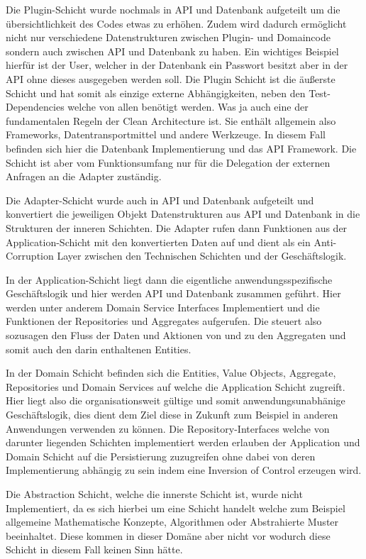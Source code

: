 Die Plugin-Schicht wurde nochmals in API und Datenbank aufgeteilt um die übersichtlichkeit des Codes etwas zu erhöhen.
Zudem wird dadurch ermöglicht nicht nur verschiedene Datenstrukturen zwischen Plugin- und Domaincode sondern auch zwischen API und Datenbank zu haben.
Ein wichtiges Beispiel hierfür ist der User, welcher in der Datenbank ein Passwort besitzt aber in der API ohne dieses ausgegeben werden soll.
Die Plugin Schicht ist die äußerste Schicht und hat somit als einzige externe Abhängigkeiten, neben den Test-Dependencies welche von allen benötigt werden.
Was ja auch eine der fundamentalen Regeln der Clean Architecture ist.
Sie enthält allgemein also Frameworks, Datentransportmittel und andere Werkzeuge.
In diesem Fall befinden sich hier die Datenbank Implementierung und das API Framework.
Die Schicht ist aber vom Funktionsumfang nur für die Delegation der externen Anfragen an die Adapter zuständig.



Die Adapter-Schicht wurde auch in API und Datenbank aufgeteilt und konvertiert die jeweiligen Objekt Datenstrukturen aus API und Datenbank in die Strukturen der inneren Schichten.
Die Adapter rufen dann Funktionen aus der Application-Schicht mit den konvertierten Daten auf und dient als ein Anti-Corruption Layer zwischen den Technischen Schichten und der Geschäftslogik.



In der Application-Schicht liegt dann die eigentliche anwendungsspezifische Geschäftslogik und hier werden API und Datenbank zusammen geführt.
Hier werden unter anderem Domain Service Interfaces Implementiert und die Funktionen der Repositories und Aggregates aufgerufen.
Die steuert also sozusagen den Fluss der Daten und Aktionen von und zu den Aggregaten und somit auch den darin enthaltenen Entities.




In der Domain Schicht befinden sich die Entities, Value Objects, Aggregate, Repositories und Domain Services auf welche die Application Schicht zugreift.
Hier liegt also die organisationsweit gültige und somit anwendungsunabhänige Geschäftslogik, dies dient dem Ziel diese in Zukunft zum Beispiel in anderen Anwendungen verwenden zu können.
Die Repository-Interfaces welche von darunter liegenden Schichten implementiert werden erlauben der Application und Domain Schicht auf die Persistierung zuzugreifen ohne dabei von deren Implementierung
abhängig zu sein indem eine Inversion of Control erzeugen wird.




Die Abstraction Schicht, welche die innerste Schicht ist, wurde nicht Implementiert, da es sich hierbei um eine Schicht handelt welche zum Beispiel allgemeine Mathematische Konzepte,
Algorithmen oder Abstrahierte Muster beeinhaltet. Diese kommen in dieser Domäne aber nicht vor wodurch diese Schicht in diesem Fall keinen Sinn hätte.